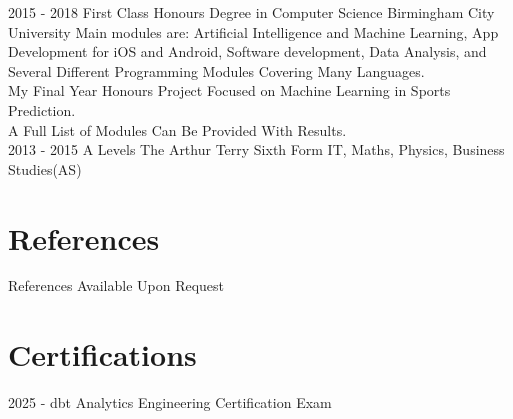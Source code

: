 \documentclass[]{friggeri-cv}
\begin{document}
\begin{entrylist}
  \entry
    {2015 - 2018}
    {First Class Honours Degree in Computer Science}
    {Birmingham City University}
    {Main modules are: Artificial Intelligence and Machine Learning, App Development for iOS and Android, Software development, Data Analysis, and Several Different Programming Modules Covering Many Languages.
    \\ My Final Year Honours Project Focused on Machine Learning in Sports Prediction. 
    \\ A Full List of Modules Can Be Provided With Results.\\}
    \entry
    {2013 - 2015}
    {A Levels}
    {The Arthur Terry Sixth Form}
    {IT, Maths, Physics, Business Studies(AS)\\}
\end{entrylist}

\section{References}
References Available Upon Request

\section{Certifications}
2025 - dbt Analytics Engineering Certification Exam
\end{document}
